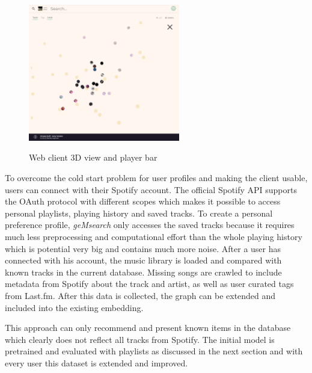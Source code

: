 \documentclass[sigconf]{acmart}
\begin{document}
\begin{figure}[ht]
	{\includegraphics[width=250px]{web_client_3d.png}}	
	\caption{Web client 3D view and player bar}
	\label{fig:web_client_3d}
\end{figure}

\label{sec:impl_spotify_connect}
To overcome the cold start problem for user profiles and making the client usable, users can connect with their Spotify account. The official Spotify API supports the OAuth protocol with different scopes which makes it possible to access personal playlists, playing history and saved tracks. To create a personal preference profile, \emph{geMsearch} only accesses the saved tracks because it requires much less preprocessing and computational effort than the whole playing history which is potential very big and contains much more noise. After a user has connected with his account, the music library is loaded and compared with known tracks in the current database. Missing songs are crawled to include metadata from Spotify about the track and artist, as well as user curated tags from Last.fm. After this data is collected, the graph can be extended and included into the existing embedding.

This approach can only recommend and present known items in the database which clearly does not reflect all tracks from Spotify. The initial model is pretrained and evaluated with playlists as discussed in the next section and with every user this dataset is extended and improved.
\end{document}
